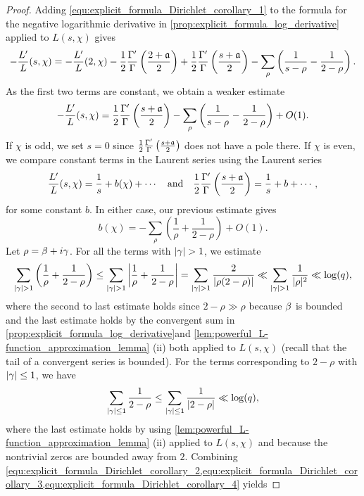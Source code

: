 \begin{proof}
      Adding \cref{equ:explicit_formula_Dirichlet_corollary_1} to the formula for the negative logarithmic derivative in \cref{prop:explicit_formula_log_derivative} applied to $L(s,\chi)$ gives
      \[
        -\frac{L'}{L}(s,\chi) = -\frac{L'}{L}(2,\chi)-\frac{1}{2}\frac{\Gamma'}{\Gamma}\left(\frac{2+\mathfrak{a}}{2}\right)+\frac{1}{2}\frac{\Gamma'}{\Gamma}\left(\frac{s+\mathfrak{a}}{2}\right)-\sum_{\rho}\left(\frac{1}{s-\rho}-\frac{1}{2-\rho}\right).
      \]
      As the first two terms are constant, we obtain a weaker estimate
      \[
        -\frac{L'}{L}(s,\chi) = \frac{1}{2}\frac{\Gamma'}{\Gamma}\left(\frac{s+\mathfrak{a}}{2}\right)-\sum_{\rho}\left(\frac{1}{s-\rho}-\frac{1}{2-\rho}\right)+O(1).
      \]
      If $\chi$ is odd, we set $s = 0$ since $\frac{1}{2}\frac{\Gamma'}{\Gamma}\left(\frac{s+\mathfrak{a}}{2}\right)$ does not have a pole there. If $\chi$ is even, we compare constant terms in the Laurent series using the Laurent series
      \[
        \frac{L'}{L}(s,\chi) = \frac{1}{s}+b(\chi)+\cdots \quad \text{and} \quad \frac{1}{2}\frac{\Gamma'}{\Gamma}\left(\frac{s+\mathfrak{a}}{2}\right) = \frac{1}{s}+b+\cdots,
      \]
      for some constant $b$. In either case, our previous estimate gives
      \begin{equation}\label{equ:explicit_formula_Dirichlet_corollary_2}
        b(\chi) = -\sum_{\rho}\left(\frac{1}{\rho}+\frac{1}{2-\rho}\right)+O(1).
      \end{equation}
      Let $\rho = \beta+i\gamma$. For all the terms with $|\gamma| > 1$, we estimate
      \begin{equation}\label{equ:explicit_formula_Dirichlet_corollary_3}
        \sum_{|\gamma| > 1}\left(\frac{1}{\rho}+\frac{1}{2-\rho}\right) \le \sum_{|\gamma| > 1}\left|\frac{1}{\rho}+\frac{1}{2-\rho}\right| = \sum_{|\gamma| > 1}\frac{2}{|\rho(2-\rho)|} \ll \sum_{|\gamma| > 1}\frac{1}{|\rho|^{2}} \ll \log(q),
      \end{equation}
      where the second to last estimate holds since $2-\rho \gg \rho$ because $\beta$ is bounded and the last estimate holds by the convergent sum in \cref{prop:explicit_formula_log_derivative}and \cref{lem:powerful_L-function_approximation_lemma} (ii) both applied to $L(s,\chi)$ (recall that the tail of a convergent series is bounded). For the terms corresponding to $2-\rho$ with $|\gamma| \le 1$, we have
      \begin{equation}\label{equ:explicit_formula_Dirichlet_corollary_4}
        \sum_{|\gamma| \le 1}\frac{1}{2-\rho} \le \sum_{|\gamma| \le 1}\frac{1}{|2-\rho|} \ll \log(q),
      \end{equation}
      where the last estimate holds by using \cref{lem:powerful_L-function_approximation_lemma} (ii) applied to $L(s,\chi)$ and because the nontrivial zeros are bounded away from $2$. Combining \cref{equ:explicit_formula_Dirichlet_corollary_2,equ:explicit_formula_Dirichlet_corollary_3,equ:explicit_formula_Dirichlet_corollary_4} yields

\end{proof}

